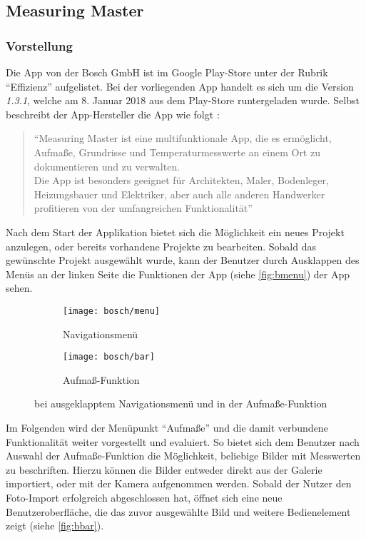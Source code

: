 \subsection{Measuring Master}
\subsubsection{Vorstellung}
Die App \mm{} von der Bosch GmbH ist im Google Play-Store unter der Rubrik ``Effizienz'' aufgelistet.
Bei der vorliegenden App handelt es sich um die Version \emph{1.3.1}, welche am 8. Januar 2018 aus dem Play-Store runtergeladen wurde.
Selbst beschreibt der App-Hersteller die App wie folgt \citep{BoschMM}:

\begin{quote}
  ``Measuring Master ist eine multifunktionale App, die es ermöglicht, Aufmaße, Grundrisse und Temperaturmesswerte an einem Ort zu dokumentieren und zu verwalten.\\
  Die App ist besonders geeignet für Architekten, Maler, Bodenleger, Heizungsbauer und Elektriker, aber auch alle anderen Handwerker profitieren von der umfangreichen Funktionalität''
\end{quote}

\noindent
Nach dem Start der Applikation bietet sich die Möglichkeit ein neues Projekt anzulegen, oder bereits vorhandene Projekte zu bearbeiten.
Sobald das gewünschte Projekt ausgewählt wurde, kann der Benutzer durch Ausklappen des Menüs an der linken Seite die Funktionen der App (siehe \autoref{fig:bmenu}) der App sehen. \\

\begin{figure}[h]
  \centering
  \begin{subfigure}[t]{0.45\textwidth}
    \texttt{[image: bosch/menu]}
    \caption{Navigationsmenü}\label{fig:bmenu}	
  \end{subfigure}
  \begin{subfigure}[t]{0.45\textwidth}
    \texttt{[image: bosch/bar]}
    \caption{Aufmaß-Funktion}\label{fig:bbar}
  \end{subfigure}
  \caption{\mm{} bei ausgeklapptem Navigationsmenü und in der Aufmaße-Funktion}
\end{figure}

Im Folgenden wird der Menüpunkt ``Aufmaße'' und die damit verbundene Funktionalität weiter vorgestellt und evaluiert.
So bietet sich dem Benutzer nach Auswahl der Aufmaße-Funktion die Möglichkeit, beliebige Bilder mit Messwerten zu beschriften.
Hierzu können die Bilder entweder direkt aus der Galerie importiert, oder mit der Kamera aufgenommen werden.
Sobald der Nutzer den Foto-Import erfolgreich abgeschlossen hat, öffnet sich eine neue Benutzeroberfläche, die das zuvor ausgewählte Bild und weitere Bedienelement zeigt (siehe \autoref{fig:bbar}). \\

